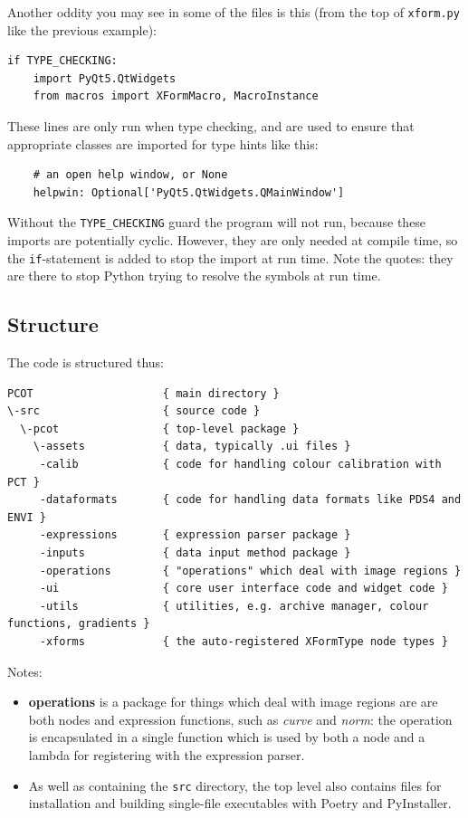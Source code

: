 Another oddity you may see in some of the files is this (from the top
of \texttt{xform.py} like the previous example):
\begin{lstlisting}
if TYPE_CHECKING:
    import PyQt5.QtWidgets
    from macros import XFormMacro, MacroInstance
\end{lstlisting}
These lines are only run when type checking, and are used to ensure
that appropriate classes are imported for type hints like this:
\begin{lstlisting}
    # an open help window, or None
    helpwin: Optional['PyQt5.QtWidgets.QMainWindow']
\end{lstlisting}
Without the \texttt{TYPE\_CHECKING} guard the program will not run, because
these imports are potentially cyclic. However, they are only needed at 
compile time, so the \texttt{if}-statement is added to stop the import
at run time. Note the quotes: they are there to stop Python trying to
resolve the symbols at run time.

\subsection{Structure}
The code is structured thus:
\begin{verbatim}
PCOT                    { main directory }
\-src                   { source code }
  \-pcot                { top-level package }
    \-assets            { data, typically .ui files }
     -calib             { code for handling colour calibration with PCT }
     -dataformats       { code for handling data formats like PDS4 and ENVI }
     -expressions       { expression parser package }
     -inputs            { data input method package }
     -operations        { "operations" which deal with image regions }
     -ui                { core user interface code and widget code }
     -utils             { utilities, e.g. archive manager, colour functions, gradients }
     -xforms            { the auto-registered XFormType node types }
\end{verbatim}
Notes:
\begin{itemize}
\item \textbf{operations} is a package for things which deal with image regions
are are both nodes and
expression functions, such as \emph{curve} and \emph{norm}: the operation
is encapsulated in a single function which is used by both a node
and a lambda for registering with the expression parser.
\item As well as containing the \texttt{src} directory, the top level
also contains files for installation and building single-file executables
with Poetry and PyInstaller.
\end{itemize}

